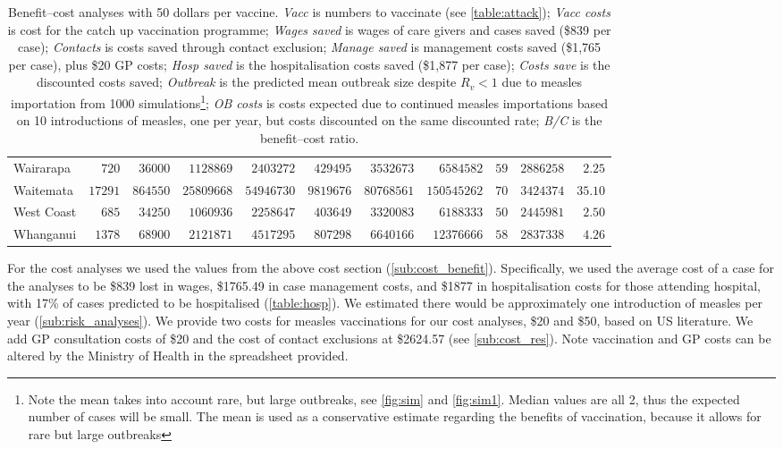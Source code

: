\documentclass{article}
\begin{document}
\begin{table}
\begin{center}
\begin{tabular}{lrrrrrrrrrr}
Wairarapa&$  720$&$ 36000$&$ 1128869$&$ 2403272$&$  429495$&$ 3532673$&$  6584582$&$ 59$&$2886258$&$ 2.25$\tabularnewline
Waitemata&$17291$&$864550$&$25809668$&$54946730$&$ 9819676$&$80768561$&$150545262$&$ 70$&$3424374$&$35.10$\tabularnewline
West Coast&$  685$&$ 34250$&$ 1060936$&$ 2258647$&$  403649$&$ 3320083$&$  6188333$&$ 50$&$2445981$&$ 2.50$\tabularnewline
Whanganui&$ 1378$&$ 68900$&$ 2121871$&$ 4517295$&$  807298$&$ 6640166$&$ 12376666$&$ 58$&$2837338$&$ 4.26$\tabularnewline
\hline
\end{tabular}\end{center}\caption{Benefit--cost analyses with 50 dollars per vaccine. \textit{Vacc} is numbers to vaccinate (see \autoref{table:attack}); \textit{Vacc costs} is cost for the catch up vaccination programme; \textit{Wages saved} is wages of care givers and cases saved (\$839 per case); \textit{Contacts} is costs saved through contact exclusion; \textit{Manage saved} is management costs saved (\$1,765 per case), plus \$20 GP costs; \textit{Hosp saved} is the hospitalisation costs saved (\$1,877 per case); \textit{Costs save}  is the discounted costs saved; \textit{Outbreak}  is the predicted mean outbreak size despite $R_v < 1$ due to measles importation from 1000 simulations\footnote{Note the mean takes into account rare, but large outbreaks, see \autoref{fig:sim} and \autoref{fig:sim1}. Median values are all 2, thus the expected number of cases will be small. The mean is used as a conservative estimate regarding the benefits of vaccination, because it allows for rare but large outbreaks}; \textit{OB costs}	is costs expected due to continued measles importations based on 10 introductions of measles, one per year, but costs discounted on the same discounted rate; \textit{B/C} is the benefit--cost ratio.}
\label{table:cost50}
\end{table}

For the cost analyses we used the values from the above cost section (\autoref{sub:cost_benefit}). Specifically, we used the average cost of a case for the analyses to be \$839 lost in wages, \$1765.49 in case management costs, and \$1877 in hospitalisation costs for those attending hospital, with 17\% of cases predicted to be hospitalised (\autoref{table:hosp}). We estimated there would be approximately one introduction of measles per year (\autoref{sub:risk_analyses}). We provide two costs for measles vaccinations for our cost analyses, \$20 and \$50, based on US literature. We add GP consultation costs of \$20 and the cost of contact exclusions at \$2624.57 (see \autoref{sub:cost_res}). Note vaccination and GP costs can be altered by the Ministry of Health in the spreadsheet provided.
\end{document}
